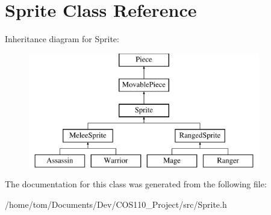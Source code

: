 \hypertarget{classSprite}{\section{Sprite Class Reference}
\label{classSprite}
}
Inheritance diagram for Sprite\-:\begin{figure}[H]
\begin{center}
\leavevmode
\includegraphics[height=5.000000cm]{classSprite}
\end{center}
\end{figure}


The documentation for this class was generated from the following file\-:\begin{DoxyCompactItemize}
\item 
/home/tom/\-Documents/\-Dev/\-C\-O\-S110\-\_\-\-Project/src/Sprite.\-h\end{DoxyCompactItemize}

